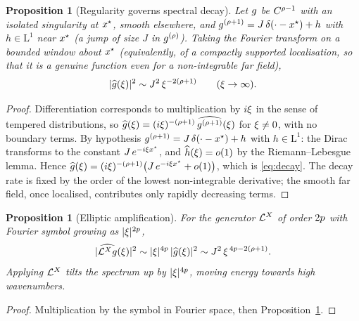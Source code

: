 \documentclass[11pt]{article}
\theoremstyle{plain}
\newtheorem{proposition}[theorem]{Proposition}
\theoremstyle{definition}
\theoremstyle{remark}
\begin{document}
\begin{proposition}[Regularity governs spectral decay]\label{prop:decay}
Let $g$ be $C^{\rho-1}$ with an isolated singularity at
$x^{\star}$, smooth elsewhere, and
$g^{(\rho+1)}=J\,\delta(\cdot-x^{\star})+h$ with
$h\in\mathrm{L}^{1}$ near $x^{\star}$ (a jump of size $J$ in
$g^{(\rho)}$). Taking the Fourier transform on a bounded window
about $x^{\star}$ (equivalently, of a compactly supported localisation, so
that it is a genuine function even for a non-integrable far field),
\begin{equation}\label{eq:decay}
  \lvert\widehat{g}(\xi)\rvert^{2}
  \sim J^{2}\,\xi^{-2(\rho+1)}
  \qquad(\xi\to\infty).
\end{equation}
\end{proposition}
\begin{proof}
Differentiation corresponds to multiplication by $i\xi$ in the sense of
tempered distributions, so
$\widehat{g}(\xi)=(i\xi)^{-(\rho+1)}\,\widehat{g^{(\rho+1)}}(\xi)$
for $\xi\neq0$, with no boundary terms. By hypothesis
$g^{(\rho+1)}=J\,\delta(\cdot-x^{\star})+h$ with
$h\in\mathrm{L}^{1}$: the Dirac transforms to the constant
$J\,e^{-i\xi x^{\star}}$, and
$\widehat{h}(\xi)=o(1)$ by the Riemann--Lebesgue lemma. Hence
$\widehat{g}(\xi)=(i\xi)^{-(\rho+1)}\bigl(J\,e^{-i\xi x^{\star}}+o(1)\bigr)$,
which is \eqref{eq:decay}. The decay rate is fixed by the order of the lowest
non-integrable derivative; the smooth far field, once localised, contributes only
rapidly decreasing terms.
\end{proof}

\begin{proposition}[Elliptic amplification]\label{prop:amp}
For the generator $\mathcal{L}^{X}$ of order $2p$ with Fourier
symbol growing as $\lvert\xi\rvert^{2p}$,
\begin{equation}\label{eq:amp}
  \lvert\widehat{\mathcal{L}^{X}g}(\xi)\rvert^{2}
  \sim \lvert\xi\rvert^{4p}\,\lvert\widehat{g}(\xi)\rvert^{2}
  \sim J^{2}\,\xi^{\,4p-2(\rho+1)} .
\end{equation}
Applying $\mathcal{L}^{X}$ tilts the spectrum up by $\lvert\xi\rvert^{4p}$,
moving energy towards high wavenumbers.
\end{proposition}
\begin{proof}
Multiplication by the symbol in Fourier space, then Proposition~\ref{prop:decay}.
\end{proof}
\end{document}

